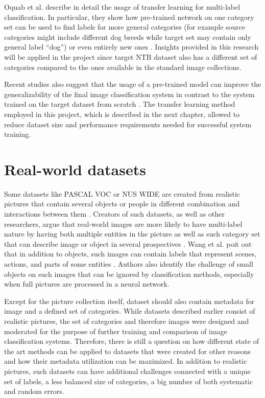 Oquab et al. describe in detail the usage of transfer learning for multi-label classification. In particular, they show how pre-trained network on one category set can be used to find labels for more general categories (for example source categories might include different dog breeds while target set may contain only general label ``dog'') or even entirely new ones \cite{Oquab2014TransferringMidLevel}. Insights provided in this research will be applied in the project since target NTB dataset also has a different set of categories compared to the ones available in the standard image collections.

Recent studies also suggest that the usage of a pre-trained model can improve the generalizability of the final image classification system in contrast to the system trained on the target dataset from scratch \cite{Oquab2014TransferringMidLevel, Yosinski2014HowTransferable}. The transfer learning method employed in this project, which is described in the next chapter, allowed to reduce dataset size and performance requirements needed for successful system training. 

\section{Real-world datasets}
Some datasets like PASCAL VOC or NUS WIDE are created from realistic pictures that contain several objects or people in different combination and interactions between them \cite{Everingham2010PASCAL-VOC, Chua2009NUS-WIDE}. Creators of such datasets, as well as other researchers, argue that real-world images are more likely to have multi-label nature by having both multiple entities in the picture as well as such category set that can describe image or object in several prospectives \cite{Everingham2010PASCAL-VOC, Chua2009NUS-WIDE, Wang2016CNN-RNN:Classification, Dong2013Subcategory-AwareClassification}. Wang et al. poit out that in addition to objects, such images can contain labels that represent scenes, actions, and parts of some entities \cite{Wang2016CNN-RNN:Classification}. Authors also identify the challenge of small objects on such images that can be ignored by classification methods, especially when full pictures are processed in a neural network.

Except for the picture collection itself, dataset should also contain metadata for image and a defined set of categories. While datasets described earlier consist of realistic pictures, the set of categories and therefore images were designed and moderated for the purpose of further training and comparison of image classification systems. Therefore, there is still a question on how different state of the art methods can be applied to datasets that were created for other reasons and how their metadata utilization can be maximized. In addition to realistic pictures, such datasets can have additional challenges connected with a unique set of labels, a less balanced size of categories, a big number of both systematic and random errors.

